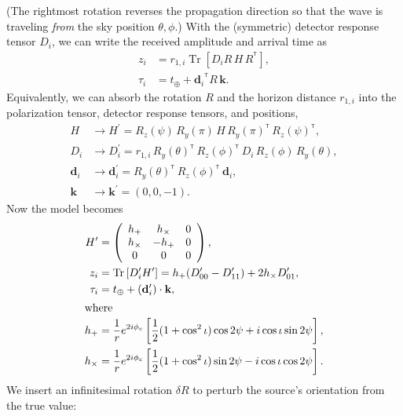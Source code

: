 \documentclass[amsmath,amssymb,aps,prx,reprint,nopreprintnumbers,nofootinbib,showpacs]{revtex4-1}
\DeclareMathOperator{\Tr}{Tr}
\newcommand\transpose{\ensuremath{^{^\mathsf{T}}}}
\begin{document}
%
(The rightmost rotation reverses the propagation direction so that the wave is traveling \emph{from} the sky position $\theta, \phi$.) With the (symmetric) detector response tensor $D_i$, we can write the received amplitude and arrival time as
%
\begin{align}
    z_i &= r_{1,i} \Tr \left[ D_i R \, H \, R\transpose \right], \\
    \tau_i &= t_\oplus + {\mathbf{d}_i}\transpose R \, \mathbf{k}.
\end{align}
%
Equivalently, we can absorb the rotation $R$ and the horizon distance $r_{1,i}$ into the polarization tensor, detector response tensors, and positions,
%
\begin{align}
    H &\rightarrow H^\prime = R_z(\psi) \, R_y(\pi) \, H \, R_y(\pi)\transpose  \, R_z(\psi)\transpose, \\
    D_i &\rightarrow D_i^\prime = r_{1,i} \, R_y(\theta)\transpose \, R_z(\phi)\transpose \, D_i \, R_z(\phi) \, R_y(\theta), \\
    \mathbf{d}_i &\rightarrow \mathbf{d}_i^\prime = R_y(\theta)\transpose \, R_z(\phi)\transpose \, \mathbf{d}_i, \\
    \mathbf{k} &\rightarrow \mathbf{k}^\prime = (0, 0, -1).
\end{align}
%
Now the model becomes
%
\begin{align}
    \label{eq:H-hplus-hcross}
    H^\prime &= \left(
        \begin{array}{ccc}
            h_+ & h_\times & 0 \\
            h_\times & -h_+ & 0 \\
            0 & 0 & 0
        \end{array}
    \right), \\
    \label{eq:z-hplus-hcross}
    z_i &= \Tr \left[ D_i^\prime H^\prime \right] = h_+ (D_{00}^\prime - D_{11}^\prime) + 2 h_\times D_{01}^\prime, \\
    \tau_i &= t_\oplus + (\mathbf{d}_i^\prime) \cdot \mathbf{k}, \\
    \intertext{where}
    \label{eq:hplus}
    h_+ &= \frac{1}{r} e^{2 i \phi_c} \left[\frac{1}{2} (1+\cos^2\iota) \cos{2\psi} + i \cos\iota \sin{2\psi}\right], \\
    \label{eq:hcross}
    h_\times &= \frac{1}{r} e^{2 i \phi_c} \left[\frac{1}{2} (1+\cos^2\iota) \sin{2\psi} - i \cos\iota \cos{2\psi}\right].
\end{align}
%
We insert an infinitesimal rotation $\delta R$ to perturb the source's orientation from the true value:
\end{document}
